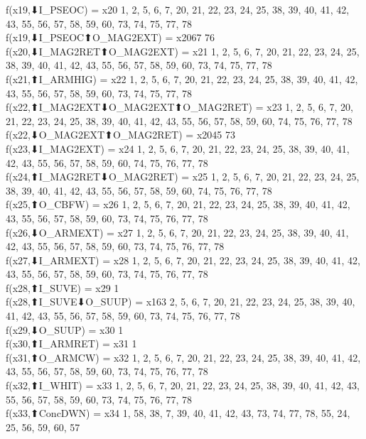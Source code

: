f(x19,⬇I_PSEOC) = x20 {1, 2, 5, 6, 7, 20, 21, 22, 23, 24, 25, 38, 39, 40, 41, 42, 43, 55, 56, 57, 58, 59, 60, 73, 74, 75, 77, 78} \\
f(x19,⬇I_PSEOC⬆O_MAG2EXT) = x2067 {76} \\
f(x20,⬇I_MAG2RET⬆O_MAG2EXT) = x21 {1, 2, 5, 6, 7, 20, 21, 22, 23, 24, 25, 38, 39, 40, 41, 42, 43, 55, 56, 57, 58, 59, 60, 73, 74, 75, 77, 78} \\
f(x21,⬆I_ARMHIG) = x22 {1, 2, 5, 6, 7, 20, 21, 22, 23, 24, 25, 38, 39, 40, 41, 42, 43, 55, 56, 57, 58, 59, 60, 73, 74, 75, 77, 78} \\
f(x22,⬆I_MAG2EXT⬇O_MAG2EXT⬆O_MAG2RET) = x23 {1, 2, 5, 6, 7, 20, 21, 22, 23, 24, 25, 38, 39, 40, 41, 42, 43, 55, 56, 57, 58, 59, 60, 74, 75, 76, 77, 78} \\
f(x22,⬇O_MAG2EXT⬆O_MAG2RET) = x2045 {73} \\
f(x23,⬇I_MAG2EXT) = x24 {1, 2, 5, 6, 7, 20, 21, 22, 23, 24, 25, 38, 39, 40, 41, 42, 43, 55, 56, 57, 58, 59, 60, 74, 75, 76, 77, 78} \\
f(x24,⬆I_MAG2RET⬇O_MAG2RET) = x25 {1, 2, 5, 6, 7, 20, 21, 22, 23, 24, 25, 38, 39, 40, 41, 42, 43, 55, 56, 57, 58, 59, 60, 74, 75, 76, 77, 78} \\
f(x25,⬆O_CBFW) = x26 {1, 2, 5, 6, 7, 20, 21, 22, 23, 24, 25, 38, 39, 40, 41, 42, 43, 55, 56, 57, 58, 59, 60, 73, 74, 75, 76, 77, 78} \\
f(x26,⬇O_ARMEXT) = x27 {1, 2, 5, 6, 7, 20, 21, 22, 23, 24, 25, 38, 39, 40, 41, 42, 43, 55, 56, 57, 58, 59, 60, 73, 74, 75, 76, 77, 78} \\
f(x27,⬇I_ARMEXT) = x28 {1, 2, 5, 6, 7, 20, 21, 22, 23, 24, 25, 38, 39, 40, 41, 42, 43, 55, 56, 57, 58, 59, 60, 73, 74, 75, 76, 77, 78} \\
f(x28,⬆I_SUVE) = x29 {1} \\
f(x28,⬆I_SUVE⬇O_SUUP) = x163 {2, 5, 6, 7, 20, 21, 22, 23, 24, 25, 38, 39, 40, 41, 42, 43, 55, 56, 57, 58, 59, 60, 73, 74, 75, 76, 77, 78} \\
f(x29,⬇O_SUUP) = x30 {1} \\
f(x30,⬆I_ARMRET) = x31 {1} \\
f(x31,⬆O_ARMCW) = x32 {1, 2, 5, 6, 7, 20, 21, 22, 23, 24, 25, 38, 39, 40, 41, 42, 43, 55, 56, 57, 58, 59, 60, 73, 74, 75, 76, 77, 78} \\
f(x32,⬆I_WHIT) = x33 {1, 2, 5, 6, 7, 20, 21, 22, 23, 24, 25, 38, 39, 40, 41, 42, 43, 55, 56, 57, 58, 59, 60, 73, 74, 75, 76, 77, 78} \\
f(x33,⬆ConcDWN) = x34 {1, 58, 38, 7, 39, 40, 41, 42, 43, 73, 74, 77, 78, 55, 24, 25, 56, 59, 60, 57} \\
